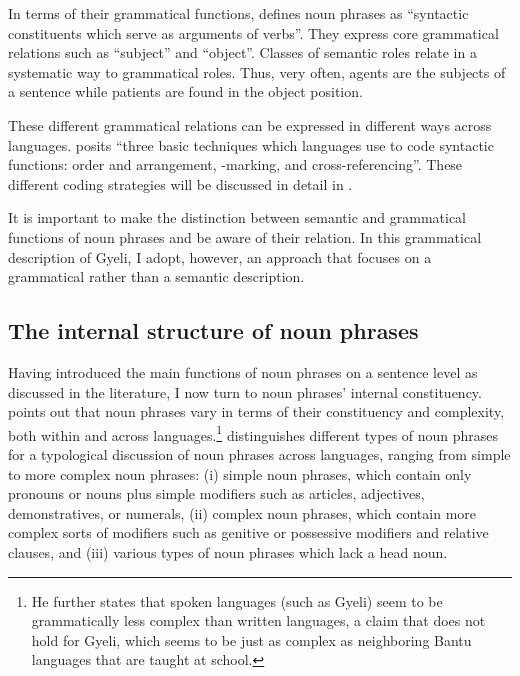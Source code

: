 \hspace*{-2pt}In terms of their grammatical functions, \citet[151]{dryer2007} defines noun phrases as ``syntactic constituents which serve as arguments of verbs''. They express core grammatical relations such as ``subject'' and ``object''. Classes of semantic roles relate in a systematic way to grammatical roles. Thus, very often, agents are the subjects of a sentence while patients are found in the object position.

\hspace*{-.5pt}These different grammatical relations can be expressed in different ways across languages. \citet[141]{andrews2007} posits ``three basic techniques which languages use to code syntactic functions: order and arrangement, {\NP}-marking, and cross-referencing''.  These different coding strategies will be discussed in detail in .

It is important to make the distinction between semantic and grammatical functions of noun phrases and be aware of their relation. In this grammatical description of Gyeli, I adopt, however, an approach that focuses on a grammatical rather than a semantic description.

\subsection*{The internal structure of noun phrases} Having introduced the main functions of noun phrases on a sentence level as discussed in the literature, I now turn to noun phrases' internal constituency. \citet[23]{rijkhoff2002} points out that noun phrases vary in terms of their constituency and complexity, both within and across languages.\footnote{He further states that spoken languages (such as Gyeli) seem to be grammatically less complex than written languages, a claim that does not hold for Gyeli, which seems to be just as complex as neighboring Bantu languages that are taught at school.} \citet[151]{dryer2007} distinguishes different  types of noun phrases for a typological discussion of noun phrases across languages, ranging from simple to more complex noun phrases: (i) simple noun phrases, which contain only pronouns or nouns plus simple modifiers such as articles, adjectives, demonstratives, or numerals, (ii) complex noun phrases, which contain more complex sorts of modifiers such as genitive or possessive modifiers and relative clauses, and (iii) various types of noun phrases which lack a head noun.




